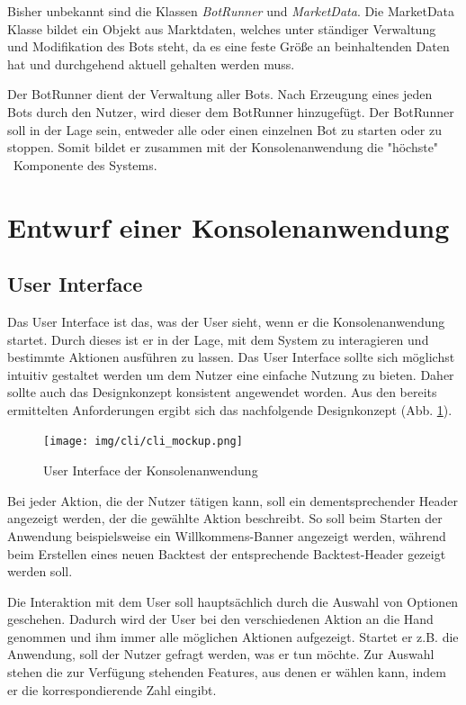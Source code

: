 \documentclass[oneside]{ausarbeitung}
\begin{document}
Bisher unbekannt sind die Klassen \textit{BotRunner} und \textit{MarketData}. Die MarketData Klasse bildet ein Objekt aus Marktdaten, welches unter ständiger Verwaltung und Modifikation des Bots steht, da es eine feste Größe an beinhaltenden Daten hat und durchgehend aktuell gehalten werden muss.

Der BotRunner dient der Verwaltung aller Bots. Nach Erzeugung eines jeden Bots durch den Nutzer, wird dieser dem BotRunner hinzugefügt. Der BotRunner soll in der Lage sein, entweder alle oder einen einzelnen Bot zu starten oder zu stoppen. Somit bildet er zusammen mit der Konsolenanwendung die "höchste" \ Komponente des Systems.


\section{Entwurf einer Konsolenanwendung}
\label{sec:entwurf_einer_konsolenanwendung}

\subsection{User Interface}
\label{sub:user_interface}

Das User Interface ist das, was der User sieht, wenn er die Konsolenanwendung startet. Durch dieses ist er in der Lage, mit dem System zu interagieren und bestimmte Aktionen ausführen zu lassen. Das User Interface sollte sich möglichst intuitiv gestaltet werden um dem Nutzer eine einfache Nutzung zu bieten. Daher sollte auch das Designkonzept konsistent angewendet worden. Aus den bereits ermittelten Anforderungen ergibt sich das nachfolgende Designkonzept (Abb. \ref{fig:15}).

\begin{figure}[H]
  \centering
  \texttt{[image: img/cli/cli\_mockup.png]}
  \caption{User Interface der Konsolenanwendung}
  \label{fig:15}
\end{figure}

Bei jeder Aktion, die der Nutzer tätigen kann, soll ein dementsprechender Header angezeigt werden, der die gewählte Aktion beschreibt. So soll beim Starten der Anwendung beispielsweise ein Willkommens-Banner angezeigt werden, während beim Erstellen eines neuen Backtest der entsprechende Backtest-Header gezeigt werden soll.

Die Interaktion mit dem User soll hauptsächlich durch die Auswahl von Optionen geschehen. Dadurch wird der User bei den verschiedenen Aktion an die Hand genommen und ihm immer alle möglichen Aktionen aufgezeigt. Startet er z.B. die Anwendung, soll der Nutzer gefragt werden, was er tun möchte. Zur Auswahl stehen die zur Verfügung stehenden Features, aus denen er wählen kann, indem er die korrespondierende Zahl eingibt.
\end{document}
